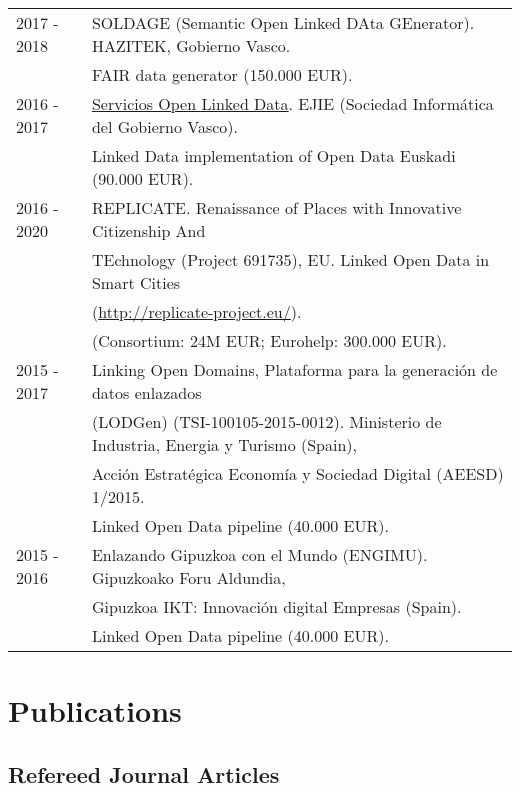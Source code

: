 \documentclass[11pt,fullpage]{article}
\begin{document}
\begin{tabular}{ll}
  2017 - 2018 & SOLDAGE (Semantic Open Linked DAta GEnerator). HAZITEK, Gobierno Vasco. \\
              & FAIR data generator (150.000 EUR). \\
	2016 - 2017 & \href{http://www.contratacion.euskadi.eus/w32-1084/es/contenidos/anuncio_contratacion/expx74j21656/es_doc/es_arch_expx74j21656.html}{Servicios Open Linked Data}. EJIE (Sociedad Inform\'atica del Gobierno Vasco). \\
	            & Linked Data implementation of Open Data Euskadi (90.000 EUR). \\
        2016 - 2020 & REPLICATE. Renaissance of Places with Innovative Citizenship And \\
                    & TEchnology (Project 691735), EU. Linked Open Data in Smart Cities \\
                    & (\href{http://replicate-project.eu/}{http://replicate-project.eu/}). \\
                    & (Consortium: 24M EUR; Eurohelp: 300.000 EUR).  \\
        2015 - 2017 & Linking Open Domains, Plataforma para la generaci\'on de datos enlazados  \\
                    & (LODGen) (TSI-100105-2015-0012). Ministerio de Industria, Energia y Turismo (Spain), \\
                    & Acción Estratégica Economía y Sociedad Digital (AEESD) 1/2015.  \\
                    & Linked Open Data pipeline (40.000 EUR). \\
	2015 - 2016 & Enlazando Gipuzkoa con el Mundo (ENGIMU). Gipuzkoako Foru Aldundia,  \\
       & Gipuzkoa IKT: Innovación digital Empresas (Spain).\\
	     & Linked Open Data pipeline (40.000 EUR). \\
\end{tabular}

\section*{Publications}

\subsection*{Refereed Journal Articles}

\setlength{\extrarowheight}{10pt}
\end{document}
